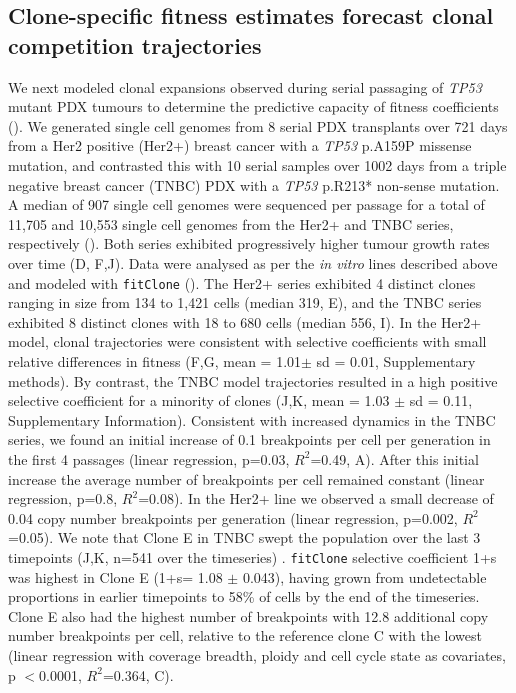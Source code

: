 \subsection*{Clone-specific fitness estimates forecast clonal competition trajectories}
We next modeled clonal expansions observed during serial passaging of \textit{TP53} mutant PDX tumours to determine the predictive capacity of fitness coefficients (). We generated single cell genomes from 8 serial PDX transplants over 721 days from a Her2 positive (Her2+)  breast cancer with a \textit{TP53} p.A159P missense mutation, and contrasted this with 10 serial samples over 1002 days from a triple negative breast cancer (TNBC) PDX with a \textit{TP53} p.R213* non-sense mutation. A median of 907 single cell genomes were sequenced per passage for a total of 11,705 and 10,553 single cell genomes from the Her2+ and TNBC series, respectively (). Both series exhibited progressively higher tumour growth rates over time (D, F,J). Data were analysed as per the \emph{in vitro} lines described above and modeled with \texttt{fitClone} (). The Her2+ series exhibited 4 distinct clones ranging in size from 134 to 1,421 cells (median 319,  E), and the TNBC series exhibited 8 distinct clones with 18 to 680 cells (median 556, I). In the Her2+ model, clonal trajectories were consistent with selective coefficients with small relative differences in fitness (F,G, mean = 1.01$\pm$ sd = 0.01, Supplementary methods).
By contrast, the TNBC model trajectories resulted in a high positive selective coefficient for a minority of clones (J,K, mean = 1.03 $\pm$ sd = 0.11,  Supplementary Information). Consistent with increased dynamics in the TNBC series, we found an initial increase of 0.1 breakpoints per cell per generation in the first 4 passages (linear regression, p=0.03, $R^2$=0.49, A). After this initial increase the average number of breakpoints per cell remained constant (linear regression, p=0.8, $R^2$=0.08). In the Her2+ line we observed a small decrease of 0.04 copy number breakpoints per generation (linear regression, p=0.002, $R^2$=0.05). We note that Clone E in TNBC swept the population over the last 3 timepoints (J,K, n=541 over the timeseries) . \texttt{fitClone} selective coefficient 1+s was highest in Clone E (1+s= 1.08 $\pm$ 0.043), having grown from undetectable proportions in earlier timepoints to 58\% of cells by the end of the timeseries. Clone E also had the highest number of breakpoints with 12.8 additional copy number breakpoints per cell, relative to the reference clone C with the lowest (linear regression with coverage breadth, ploidy and cell cycle state as covariates, p $<$0.0001, $R^2$=0.364, C). 

